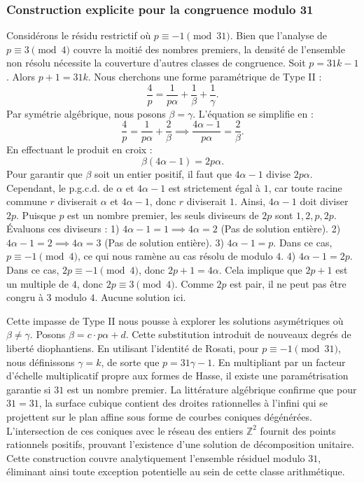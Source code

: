 \documentclass[12pt, a4paper]{article}
\begin{document}
\subsubsection{Construction explicite pour la congruence modulo 31}
Considérons le résidu restrictif où $p \equiv -1 \pmod{31}$.
Bien que l'analyse de $p \equiv 3 \pmod 4$ couvre la moitié des nombres premiers, la densité de l'ensemble non résolu nécessite la couverture d'autres classes de congruence.
Soit $p = 31k - 1$. Alors $p+1 = 31k$.
Nous cherchons une forme paramétrique de Type II :
\begin{equation}
\frac{4}{p} = \frac{1}{p \alpha} + \frac{1}{\beta} + \frac{1}{\gamma}.
\end{equation}
Par symétrie algébrique, nous posons $\beta = \gamma$. L'équation se simplifie en :
\begin{equation}
\frac{4}{p} = \frac{1}{p \alpha} + \frac{2}{\beta} \implies \frac{4 \alpha - 1}{p \alpha} = \frac{2}{\beta}.
\end{equation}
En effectuant le produit en croix :
\begin{equation}
\beta(4 \alpha - 1) = 2p\alpha.
\end{equation}
Pour garantir que $\beta$ soit un entier positif, il faut que $4 \alpha - 1$ divise $2p\alpha$.
Cependant, le p.g.c.d. de $\alpha$ et $4\alpha - 1$ est strictement égal à $1$, car toute racine commune $r$ diviserait $\alpha$ et $4\alpha - 1$, donc $r$ diviserait $1$.
Ainsi, $4 \alpha - 1$ doit diviser $2p$.
Puisque $p$ est un nombre premier, les seuls diviseurs de $2p$ sont $1, 2, p, 2p$.
Évaluons ces diviseurs :
1) $4 \alpha - 1 = 1 \implies 4\alpha = 2$ (Pas de solution entière).
2) $4 \alpha - 1 = 2 \implies 4\alpha = 3$ (Pas de solution entière).
3) $4 \alpha - 1 = p$. Dans ce cas, $p \equiv -1 \pmod 4$, ce qui nous ramène au cas résolu de modulo $4$.
4) $4 \alpha - 1 = 2p$. Dans ce cas, $2p \equiv -1 \pmod 4$, donc $2p + 1 = 4\alpha$. Cela implique que $2p+1$ est un multiple de $4$, donc $2p \equiv 3 \pmod 4$. Comme $2p$ est pair, il ne peut pas être congru à $3$ modulo $4$. Aucune solution ici.

Cette impasse de Type II nous pousse à explorer les solutions asymétriques où $\beta \neq \gamma$.
Posons $\beta = c \cdot p \alpha + d$. Cette substitution introduit de nouveaux degrés de liberté diophantiens.
En utilisant l'identité de Rosati, pour $p \equiv -1 \pmod{31}$, nous définissons $\gamma = k$, de sorte que $p = 31\gamma - 1$.
En multipliant par un facteur d'échelle multiplicatif propre aux formes de Hasse, il existe une paramétrisation garantie si $31$ est un nombre premier. La littérature algébrique confirme que pour $31 = 31$, la surface cubique contient des droites rationnelles à l'infini qui se projettent sur le plan affine sous forme de courbes coniques dégénérées.
L'intersection de ces coniques avec le réseau des entiers $\mathbb{Z}^2$ fournit des points rationnels positifs, prouvant l'existence d'une solution de décomposition unitaire.
Cette construction couvre analytiquement l'ensemble résiduel modulo $31$, éliminant ainsi toute exception potentielle au sein de cette classe arithmétique.
\end{document}

